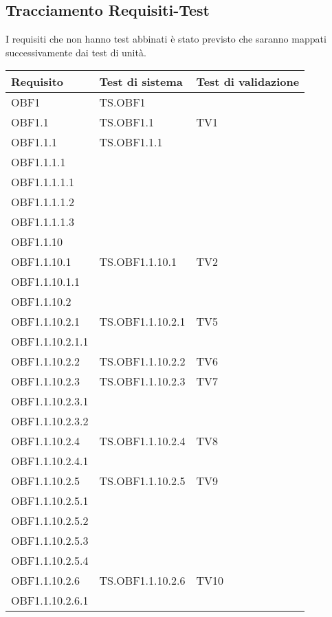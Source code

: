 \documentclass{scalatekids-article}
\begin{document}
\subsection{Tracciamento Requisiti-Test}

I requisiti che non hanno test abbinati è stato previsto che
saranno mappati successivamente dai test di unità.

\begin{longtable}[H]{|l|p{4cm}|p{4cm}|}
  \hline
  \textbf{Requisito} & \textbf{Test di sistema} & \textbf{Test di validazione}\\
  \hline
  OBF1 & TS.OBF1 &  \\
  \hline
  OBF1.1 & TS.OBF1.1 & TV1 \\
  \hline
  OBF1.1.1 & TS.OBF1.1.1 & \\
  \hline
  OBF1.1.1.1 & & \\
  \hline
  OBF1.1.1.1.1 & & \\
  \hline
  OBF1.1.1.1.2 & & \\
  \hline
  OBF1.1.1.1.3 & & \\
  \hline
  OBF1.1.10 & & \\
  \hline
  OBF1.1.10.1 & TS.OBF1.1.10.1 & TV2 \\
  \hline
  OBF1.1.10.1.1 & & \\
  \hline
  OBF1.1.10.2 &  & \\
  \hline
  OBF1.1.10.2.1 & TS.OBF1.1.10.2.1 & TV5 \\
  \hline
  OBF1.1.10.2.1.1 & & \\
  \hline
  OBF1.1.10.2.2 & TS.OBF1.1.10.2.2 & TV6\\
  \hline
  OBF1.1.10.2.3 & TS.OBF1.1.10.2.3 & TV7\\
  \hline
  OBF1.1.10.2.3.1 & & \\
  \hline
  OBF1.1.10.2.3.2 & & \\
  \hline
  OBF1.1.10.2.4 & TS.OBF1.1.10.2.4 & TV8\\
  \hline
  OBF1.1.10.2.4.1 & & \\
  \hline
  OBF1.1.10.2.5 & TS.OBF1.1.10.2.5 & TV9\\
  \hline
  OBF1.1.10.2.5.1 & & \\
  \hline
  OBF1.1.10.2.5.2 & & \\
  \hline
  OBF1.1.10.2.5.3 & & \\
  \hline
  OBF1.1.10.2.5.4 & & \\
  \hline
  OBF1.1.10.2.6 & TS.OBF1.1.10.2.6 & TV10\\
  \hline
  OBF1.1.10.2.6.1 & & \\

\end{longtable}
\end{document}
